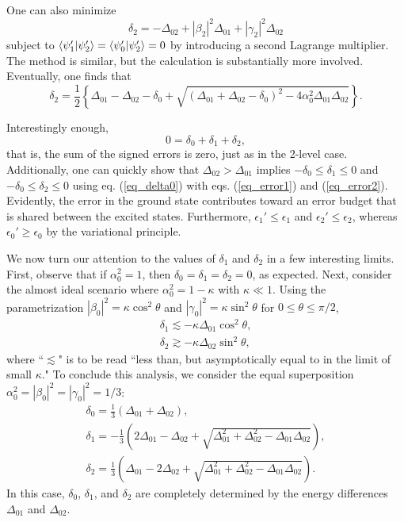 \documentclass[aps,10pt,superscriptaddress,floatfix,nofootinbib,notitlepage]{revtex4-1}
\begin{document}
One can also minimize 
\begin{equation}
    \delta_2
    =-\Delta_{02}
    +|\beta_2|^2\Delta_{01}
    +|\gamma_2|^2\Delta_{02}
\end{equation}
subject to 
$\braket{\psi_1'|\psi_2'}=\braket{\psi_0'|\psi_2'}=0$ by introducing a second Lagrange multiplier. The method is similar, but the calculation is substantially more involved. Eventually, one finds that
\begin{equation}\label{eq_error2}
    \delta_2
    =\frac{1}{2}
    \left\{
    \Delta_{01}
    -\Delta_{02}
    -\delta_0
    +\sqrt{(\Delta_{01}+\Delta_{02}-\delta_0)^2
    -4\alpha_0^2\Delta_{01}\Delta_{02}}
    \right\}.
\end{equation}

Interestingly enough, 
\begin{equation}
    0=\delta_0+\delta_1+\delta_2,
\end{equation}
that is, the sum of the signed errors is zero, just as in the 2-level case. Additionally, one can quickly show that $\Delta_{02}>\Delta_{01}$ implies $-\delta_0\leq\delta_1\leq0$ and $-\delta_0\leq\delta_2\leq0$ using eq. (\ref{eq_delta0}) with eqs. (\ref{eq_error1}) and (\ref{eq_error2}). Evidently, the error in the ground state contributes toward an error budget that is shared between the excited states. Furthermore, $\epsilon_1'\leq\epsilon_1$ and $\epsilon_2'\leq\epsilon_2$, whereas $\epsilon_0'\geq\epsilon_0$ by the variational principle.

We now turn our attention to the values of $\delta_1$ and $\delta_2$ in a few interesting limits. First, observe that if $\alpha_0^2=1$, then $\delta_0=\delta_1=\delta_2=0$, as expected. Next, consider the almost ideal scenario where $\alpha_0^2=1-\kappa$ with $\kappa\ll1$. Using the parametrization $|\beta_0|^2=\kappa\cos^2\theta$ and $|\gamma_0|^2=\kappa\sin^2\theta$ for $0\leq\theta\leq\pi/2$,
\begin{gather}
    \delta_1
    \lesssim
    -\kappa\Delta_{01}\cos^2\theta, \\
    \delta_2\gtrsim
    -\kappa\Delta_{02}\sin^2\theta,
\end{gather}
where ``$\lesssim$" is to be read ``less than, but asymptotically equal to in the limit of small $\kappa$." To conclude this analysis, we consider the equal superposition $\alpha_0^2=|\beta_0|^2=|\gamma_0|^2=1/3$:
\begin{gather}
    \delta_0=\frac{1}{3}(\Delta_{01}+\Delta_{02}), \\
    \delta_1=-\frac{1}{3}\left(2\Delta_{01}-\Delta_{02}+\sqrt{\Delta_{01}^2+\Delta_{02}^2-\Delta_{01}\Delta_{02}}\right), \\
    \delta_2=\frac{1}{3}\left(\Delta_{01}-2\Delta_{02}+\sqrt{\Delta_{01}^2+\Delta_{02}^2-\Delta_{01}\Delta_{02}}\right).
\end{gather}
In this case, $\delta_0$, $\delta_1$, and $\delta_2$ are completely determined by the energy differences $\Delta_{01}$ and $\Delta_{02}$.
\end{document}
